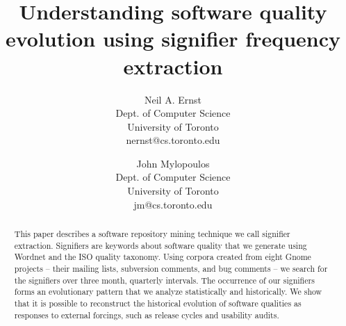 \documentclass[conference, compsoc]{IEEEtran}
\begin{document}

 
\title{Understanding software quality evolution using signifier frequency extraction}
\author{
Neil A. Ernst\\Dept. of Computer Science\\University of Toronto\\nernst@cs.toronto.edu \and
John Mylopoulos\\Dept. of Computer Science\\University of Toronto\\jm@cs.toronto.edu }

\maketitle

\begin{abstract}
This paper describes a software repository mining technique we call signifier extraction. Signifiers are keywords about software quality that we generate using Wordnet and the ISO quality taxonomy. Using corpora created from eight Gnome projects -- their mailing lists, subversion comments, and bug comments -- we search for the signifiers over three month, quarterly intervals. The occurrence of our signifiers forms an evolutionary pattern that we analyze statistically and historically. We show that it is possible to reconstruct the historical evolution of software qualities as responses to external forcings, such as release cycles and usability audits. %
\end{abstract}
\vspace{-2mm}
\end{document}

